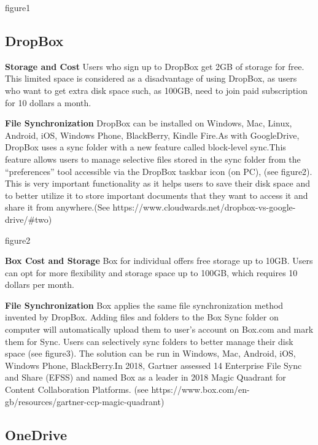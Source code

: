 \documentclass{article}
\begin{document}
figure1

\subsection{DropBox}
\textbf{Storage and Cost}
Users who sign up to DropBox get 2GB of storage for free. This limited space is considered as a disadvantage of using DropBox, as users who want to get extra disk space such, as 100GB, need to join paid subscription for 10 dollars a month.

\newline
\hfill \break
\textbf{File Synchronization}
DropBox can be installed on Windows, Mac, Linux, Android, iOS, Windows Phone, BlackBerry, Kindle Fire.As with GoogleDrive, DropBox uses a sync folder with a new feature called block-level sync.This feature allows users to manage selective files stored in the sync folder from the “preferences” tool accessible via the DropBox taskbar icon (on PC), (see figure2). This is very important functionality as it helps users to save their disk space and to better utilize it to store important documents that they want to access it and share it from anywhere.(See https://www.cloudwards.net/dropbox-vs-google-drive/#two)

\newline
\hfill \break

figure2

\newline
\hfill \break
\textbf{Box Cost and Storage}
Box for individual offers free storage up to 10GB. Users can opt for more flexibility and storage space up to 100GB, which requires 10 dollars per month.

\newline
\hfill \break
\textbf{File Synchronization}
Box applies the same file synchronization method invented by DropBox. Adding files and folders to the Box Sync folder on computer will automatically upload them to user’s account on Box.com and mark them for Sync. Users can selectively sync folders to better manage their disk space (see figure3). The solution can be run in Windows, Mac, Android, iOS, Windows Phone, BlackBerry.In 2018, Gartner assessed 14 Enterprise File Sync and Share (EFSS) and named Box as a leader in
2018 Magic Quadrant for Content Collaboration Platforms. (see  https://www.box.com/en-gb/resources/gartner-ccp-magic-quadrant)

\newline
\hfill \break
\subsection{OneDrive}
\end{document}
